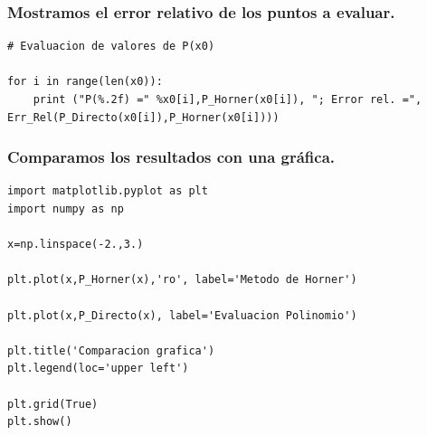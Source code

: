 \begin{frame}[fragile]
\frametitle{Mostramos el error relativo de los puntos a evaluar.}
\fontsize{14}{14}\selectfont
\begin{lstlisting}[style= FormattedNumber, basicstyle=\linespread{0.9}\ttfamily\normalsize, columns=fullflexible]
# Evaluacion de valores de P(x0)

for i in range(len(x0)):                 
    print ("P(%.2f) =" %x0[i],P_Horner(x0[i]), "; Error rel. =", Err_Rel(P_Directo(x0[i]),P_Horner(x0[i])))
\end{lstlisting}
\end{frame}
\begin{frame}[fragile]
\frametitle{Comparamos los resultados con una gráfica.}
\fontsize{14}{14}\selectfont
\begin{lstlisting}[style= FormattedNumber, basicstyle=\linespread{0.9}\ttfamily\small, columns=fullflexible]
import matplotlib.pyplot as plt
import numpy as np

x=np.linspace(-2.,3.)

plt.plot(x,P_Horner(x),'ro', label='Metodo de Horner')

plt.plot(x,P_Directo(x), label='Evaluacion Polinomio')

plt.title('Comparacion grafica')
plt.legend(loc='upper left')

plt.grid(True)
plt.show()
\end{lstlisting}
\end{frame}
